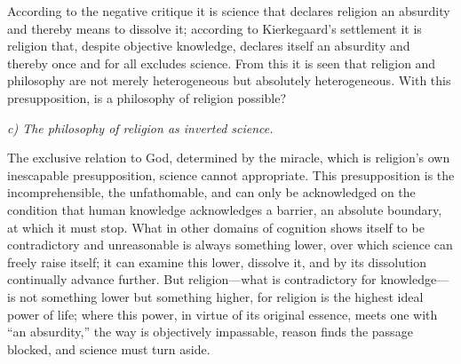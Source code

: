 \documentclass[12pt,a4paper]{article}
\begin{document}
According to the negative critique it is science that declares
religion an absurdity and thereby means to dissolve it;
according to Kierkegaard's settlement it is religion that,
despite objective knowledge, declares itself an absurdity and
thereby once and for all excludes science. From this it is seen
that religion and philosophy are not merely heterogeneous but
absolutely heterogeneous. With this presupposition, is a
philosophy of religion possible?

\medskip

\noindent\textit{c) The philosophy of religion as inverted science.}

\medskip

The exclusive relation to God, determined by the miracle, which
is religion's own inescapable presupposition, science cannot
appropriate. This presupposition is the incomprehensible, the
unfathomable, and can only be acknowledged on the condition that
human knowledge acknowledges a barrier, an absolute boundary, at
which it must stop. What in other domains of cognition shows
itself to be contradictory and unreasonable is always something
lower, over which science can freely raise itself; it can
examine this lower, dissolve it, and by its dissolution
continually advance further. But religion---what is
contradictory for knowledge---is not something lower but
something higher, for religion is the highest ideal power of
life; where this power, in virtue of its original essence,
meets one with ``an absurdity,'' the way is objectively
impassable, reason finds the passage blocked, and science must
turn aside.
\end{document}
